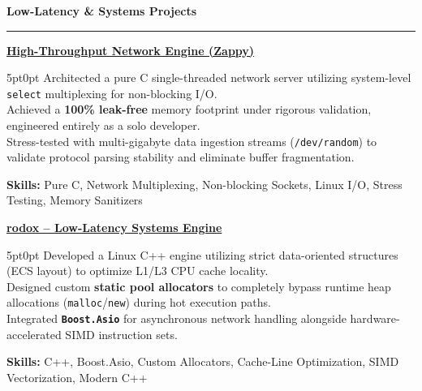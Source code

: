 \documentclass[9pt]{extarticle}
\begin{document}
\par\vspace{5pt}

{\large\bfseries Low-Latency \& Systems Projects}
\par\vspace{-8pt}
\rule{\linewidth}{0.4pt}
\par\vspace{5pt}

\underline{\bfseries High-Throughput Network Engine (Zappy)}
\par
\begin{adjustwidth}{5pt}{0pt}
    Architected a pure C single-threaded network server utilizing system-level \texttt{select} multiplexing for non-blocking I/O. \\
    Achieved a {\bfseries 100\% leak-free} memory footprint under rigorous validation, engineered entirely as a solo developer. \\
    Stress-tested with multi-gigabyte data ingestion streams (\texttt{/dev/random}) to validate protocol parsing stability and eliminate buffer fragmentation.
\end{adjustwidth}
\par
{\bfseries Skills:} Pure C, Network Multiplexing, Non-blocking Sockets, Linux I/O, Stress Testing, Memory Sanitizers

\par\vspace{8pt}

\underline{\bfseries rodox -- Low-Latency Systems Engine}
\par
\begin{adjustwidth}{5pt}{0pt}
    Developed a Linux C++ engine utilizing strict data-oriented structures (ECS layout) to optimize L1/L3 CPU cache locality. \\
    Designed custom {\bfseries static pool allocators} to completely bypass runtime heap allocations (\texttt{malloc}/\texttt{new}) during hot execution paths. \\
    Integrated {\bfseries \texttt{Boost.Asio}} for asynchronous network handling alongside hardware-accelerated SIMD instruction sets.
\end{adjustwidth}
\par
{\bfseries Skills:} C++, Boost.Asio, Custom Allocators, Cache-Line Optimization, SIMD Vectorization, Modern C++

\par\vspace{8pt}
\end{document}
